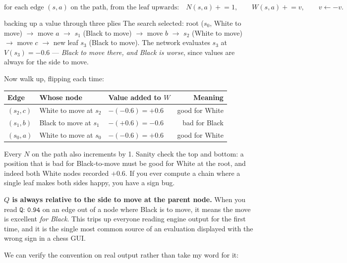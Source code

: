 \begin{equation}
  \label{eq:backup}
  \text{for each edge } (s,a) \text{ on the path, from the leaf upwards:}\quad
  N(s,a) \mathrel{+}= 1, \qquad W(s,a) \mathrel{+}= v,\qquad v \leftarrow -v .
\end{equation}

\begin{worked}{backing up a value through three plies}
The search selected: root ($s_0$, White to move) $\to$ move $a$ $\to$ $s_1$ (Black to move)
$\to$ move $b$ $\to$ $s_2$ (White to move) $\to$ move $c$ $\to$ new leaf $s_3$ (Black to
move). The network evaluates $s_3$ at $V(s_3) = -0.6$ --- \emph{Black to move there, and
Black is worse}, since values are always for the side to move.

Now walk up, flipping each time:
\begin{center}
\begin{tabular}{@{}lllr@{}}
\toprule
Edge & Whose node & Value added to $W$ & Meaning \\
\midrule
$(s_2, c)$ & White to move at $s_2$ & $-(-0.6) = +0.6$ & good for White \\
$(s_1, b)$ & Black to move at $s_1$ & $-(+0.6) = -0.6$ & bad for Black \\
$(s_0, a)$ & White to move at $s_0$ & $-(-0.6) = +0.6$ & good for White \\
\bottomrule
\end{tabular}
\end{center}
Every $N$ on the path also increments by 1. Sanity check the top and bottom: a position that
is bad for Black-to-move must be good for White at the root, and indeed both White nodes
recorded $+0.6$. If you ever compute a chain where a single leaf makes both sides happy, you
have a sign bug.
\end{worked}

\begin{keyidea}
\textbf{$Q$ is always relative to the side to move at the parent node.} When you read
$\texttt{Q: 0.94}$ on an edge out of a node where Black is to move, it means the move is
excellent \emph{for Black}. This trips up everyone reading engine output for the first time,
and it is the single most common source of an evaluation displayed with the wrong sign in a
chess GUI.
\end{keyidea}

We can verify the convention on real output rather than take my word for it:

